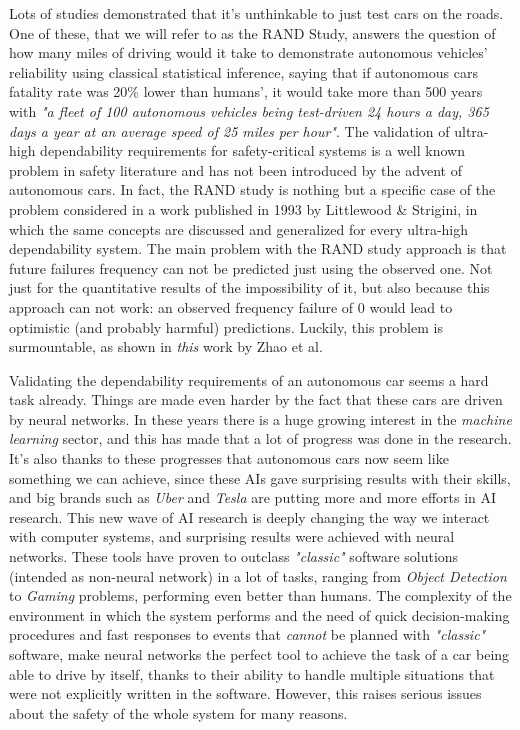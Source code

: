 Lots of studies demonstrated that it's unthinkable to just test cars on the roads. One of these, that we will refer to as the RAND Study, answers the question of how many miles of driving would it take to demonstrate autonomous vehicles' reliability using classical statistical inference, saying that if autonomous cars fatality rate was 20\% lower than humans', it would take more than 500 years with \textsl{"a fleet of 100 autonomous vehicles being test-driven 24 hours a day, 365 days a year at an average speed of 25 miles per hour"}.\cite{randstudy}\newline
The validation of ultra-high dependability requirements for safety-critical systems is a well known problem in safety literature and has not been introduced by the advent of autonomous cars. In fact, the RAND study is nothing but a specific case of the problem considered in a work published in 1993 by Littlewood \& Strigini, in which the same concepts are discussed and generalized for every ultra-high dependability system.\cite{littlewoodStrigini}\newline
The main problem with the RAND study approach is that future failures frequency can not be predicted just using the observed one. Not just for the quantitative results of the impossibility of it, but also because this approach can not work: an observed frequency failure of $0$ would lead to optimistic (and probably harmful) predictions. Luckily, this problem is surmountable, as shown in \textsl{this}\cite{zhaoStrigini} work by Zhao et al.

Validating the dependability requirements of an autonomous car seems a hard task already. Things are made even harder by the fact that these cars are driven by neural networks.\newline
In these years there is a huge growing interest in the \textsl{machine learning} sector, and this has made that a lot of progress was done in the research. It's also thanks to these progresses that autonomous cars now seem like something we can achieve, since these AIs gave surprising results with their skills, and big brands such as \textsl{Uber} and \textsl{Tesla} are putting more and more efforts in AI research.
This new wave of AI research is deeply changing the way we interact with computer systems, and surprising results were achieved with neural networks.\newline
These tools have proven to outclass \textsl{"classic"} software solutions (intended as non-neural network) in a lot of tasks, ranging from \textsl{Object Detection}\cite{retinaNet} to \textsl{Gaming}\cite{alphaGo} problems, performing even better than humans.\cite{alphaGoBeatsMan}
The complexity of the environment in which the system performs and the need of quick decision-making procedures and fast responses to events that \textsl{cannot} be planned with \textsl{"classic"} software, make neural networks the perfect tool to achieve the task of a car being able to drive by itself, thanks to their ability to handle multiple situations that were not explicitly written in the software. However, this raises serious issues about the safety of the whole system for many reasons.\newline

